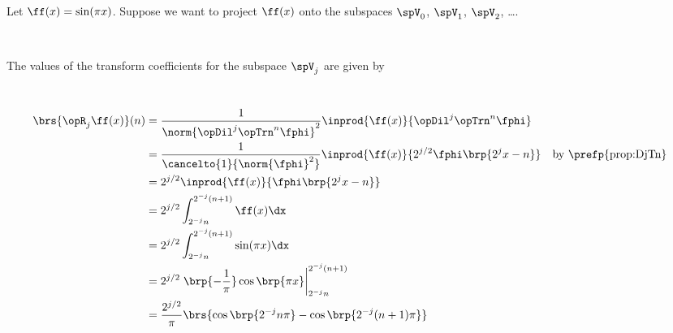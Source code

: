 \begin{example}
\begin{minipage}{\tw-64mm}
Let $\ff(x)=\sin(\pi x)$.
Suppose we want to project $\ff(x)$ onto the subspaces $\spV_0$, $\spV_1$, $\spV_2$, \ldots.
\end{minipage}%
\hfill{}%
\\
\begin{minipage}{\tw-68mm}
\ragr
The values of the transform coefficients for the subspace $\spV_j$ are %
given by
\end{minipage}%
\hfill%
\\
  \begin{align*}
    \brs{\opR_j\ff(x)}(n) 
      &=    \frac{1}{\norm{\opDil^j\opTrn^n\fphi}^2}\inprod{\ff(x)}{\opDil^j\opTrn^n\fphi} 
    \\&=    \frac{1}{\cancelto{1}{\norm{\fphi}^2}}\inprod{\ff(x)}{2^{j/2}\fphi\brp{2^j x-n}} 
      &&    \text{by \prefp{prop:DjTn}}
    \\&=    2^{j/2} \inprod{\ff(x)}{\fphi\brp{2^j x-n}} 
    \\&=    2^{j/2} 
            \int_{2^{-j}n}^{2^{-j}(n+1)} \ff(x) \dx
    \\&=    2^{j/2} 
            \int_{2^{-j}n}^{2^{-j}(n+1)} \sin(\pi x) \dx
    \\&=    2^{j/2}
            \left. \brp{-\frac{1}{\pi}}\cos\brp{\pi x} \right|_{2^{-j} n}^{2^{-j}(n+1)}
    \\&=    \frac{2^{j/2}}{\pi}
            \brs{
              \cos\brp{{2^{-j}n\pi}} -
              \cos\brp{{2^{-j}(n+1)\pi}}  
              }
  \end{align*}




\end{example}
